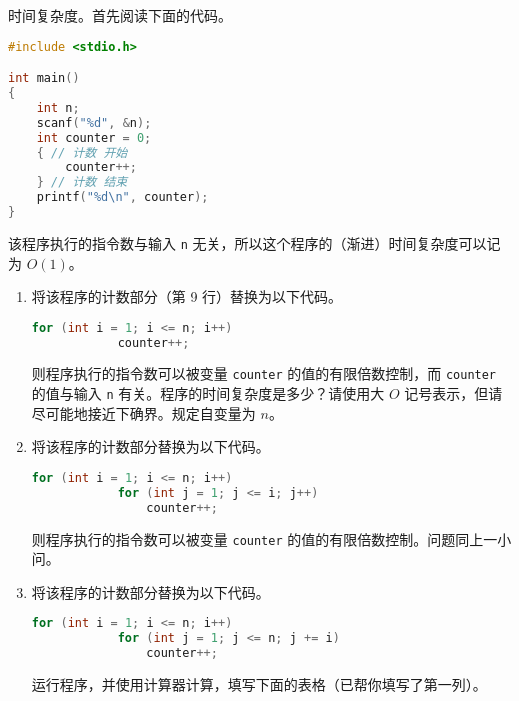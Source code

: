 \begin{problemset}
	\item 时间复杂度。首先阅读下面的代码。

	\begin{lstlisting}[language=c]
#include <stdio.h>

int main()
{
	int n;
	scanf("%d", &n);
	int counter = 0;
	{ // 计数 开始
		counter++;
	} // 计数 结束
	printf("%d\n", counter);
}
	\end{lstlisting}

	该程序执行的指令数与输入 \lstinline{n} 无关，所以这个程序的（渐进）时间复杂度可以记为 $O(1)$。

	\begin{enumerate}
		\item 将该程序的计数部分（第 9 行）替换为以下代码。

		\begin{lstlisting}[language=c, firstnumber=9]
		for (int i = 1; i <= n; i++)
			counter++;
		\end{lstlisting}

		则程序执行的指令数可以被变量 \lstinline{counter} 的值的有限倍数控制，而 \lstinline{counter} 的值与输入 \lstinline{n} 有关。程序的时间复杂度是多少？请使用大 $O$ 记号表示，但请尽可能地接近下确界。规定自变量为 $n$。

		\item 将该程序的计数部分替换为以下代码。

		\begin{lstlisting}[language=c, firstnumber=9]
		for (int i = 1; i <= n; i++)
			for (int j = 1; j <= i; j++)
				counter++;
		\end{lstlisting}

		则程序执行的指令数可以被变量 \lstinline{counter} 的值的有限倍数控制。问题同上一小问。

		\item 将该程序的计数部分替换为以下代码。

		\begin{lstlisting}[language=c, firstnumber=9]
		for (int i = 1; i <= n; i++)
			for (int j = 1; j <= n; j += i)
				counter++;
		\end{lstlisting}

		运行程序，并使用计算器计算，填写下面的表格（已帮你填写了第一列）。


\end{enumerate}
\end{problemset}
